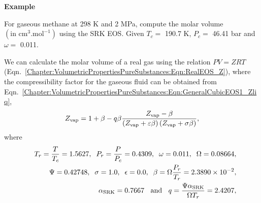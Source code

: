    \begin{MyExample}{\begin{center}{\bf Example}\end{center}}
     \begin{example}\label{Chapter:VolumetricPropertiesPureSubstances:Example3}
        For gaseous methane at 298 K and 2 MPa, compute the molar volume $\left(\text{in cm}^{3}.\text{mol}^{-1}\right)$ using the SRK EOS. Given $T_{c}=$ 190.7 K, $P_{c}=$ 46.41 bar and $\omega=$ 0.011.
     \end{example}

       We can calculate the molar volume of a real gas using the relation $PV=ZRT$ (Eqn.~\ref{Chapter:VolumetricPropertiesPureSubstances:Eqn:RealEOS_Z}), where the compressibility factor for the gaseous fluid can be obtained from Eqn.~\ref{Chapter:VolumetricPropertiesPureSubstances:Eqn:GeneralCubicEOS1_Zliq},
           \begin{displaymath}
                Z_{\text{vap}} = 1 + \beta - q\beta \displaystyle\frac{Z_{\text{vap}} - \beta} {\left(Z_{\text{vap}}+\varepsilon\beta\right)\left(Z_{\text{vap}} +\sigma\beta\right)},
           \end{displaymath}
           where 
           \begin{eqnarray}
               && T_{r}=\displaystyle\frac{T}{T_{c}} = 1.5627,\;\;P_{r}=\displaystyle\frac{P}{P_{c}}=0.4309,\;\;\omega=0.011,\;\;\Omega = 0.08664, \nonumber \\
               && \Psi = 0.42748,\;\; \sigma=1.0,\;\;\epsilon=0.0,\;\;\beta=\Omega\displaystyle\frac{P_{r}}{T_{r}}=2.3890\times 10^{-2},\nonumber \\
               && \alpha_{\text{SRK}} = 0.7667\;\;\text{ and }\;\; q = \displaystyle\frac{\Psi\alpha_{\text{SRK}}}{\Omega T_{r}} = 2.4207, \nonumber 
           \end{eqnarray}


\end{MyExample}
